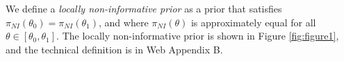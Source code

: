 \documentclass[useAMS,usenatbib,referee]{biom}
\begin{document}
We define a \textit{locally non-informative prior} as a prior that satisfies $\pi_{NI}(\theta_0) = \pi_{NI}(\theta_1)$, and where $\pi_{NI}(\theta)$ is approximately equal for all $\theta \in \left[\theta_0,\theta_1\right]$.
The locally non-informative prior is shown in Figure \ref{fig:figure1}, and the technical definition is in Web Appendix B.
\end{document}

